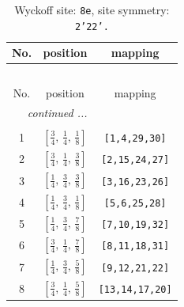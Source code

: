 \documentclass[fleqn,8pt]{jsarticle}
\begin{document}
\begin{longtable}{ccc}
\caption{Wyckoff site: {\tt 8e}, site symmetry: {\tt 2'22'.}}
 \\
 \hline \hline
No. & position & mapping \\ \hline \endfirsthead

\multicolumn{2}{l}{\tablename\ \thetable{}} \\
 \hline \hline
No. & position & mapping \\ \hline \endhead

 \hline \hline
\multicolumn{2}{r}{\footnotesize\it continued ...} \\ \endfoot

 \hline \hline
\multicolumn{2}{r}{} \\ \endlastfoot

1 & $\left[ \frac{3}{4},\, \frac{1}{4},\, \frac{1}{8} \right]$ & {\tt [1,4,29,30]} \\ \hline
2 & $\left[ \frac{3}{4},\, \frac{1}{4},\, \frac{3}{8} \right]$ & {\tt [2,15,24,27]} \\ \hline
3 & $\left[ \frac{1}{4},\, \frac{3}{4},\, \frac{3}{8} \right]$ & {\tt [3,16,23,26]} \\ \hline
4 & $\left[ \frac{1}{4},\, \frac{3}{4},\, \frac{1}{8} \right]$ & {\tt [5,6,25,28]} \\ \hline
5 & $\left[ \frac{1}{4},\, \frac{3}{4},\, \frac{7}{8} \right]$ & {\tt [7,10,19,32]} \\ \hline
6 & $\left[ \frac{3}{4},\, \frac{1}{4},\, \frac{7}{8} \right]$ & {\tt [8,11,18,31]} \\ \hline
7 & $\left[ \frac{1}{4},\, \frac{3}{4},\, \frac{5}{8} \right]$ & {\tt [9,12,21,22]} \\ \hline
8 & $\left[ \frac{3}{4},\, \frac{1}{4},\, \frac{5}{8} \right]$ & {\tt [13,14,17,20]} \\
\end{longtable}
\renewcommand{\arraystretch}{1.2}
\end{document}
